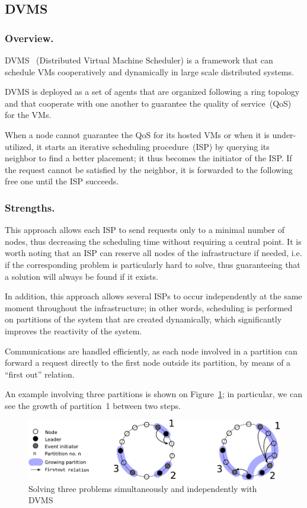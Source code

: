 

\subsection{DVMS}

\subsubsection{Overview.}
DVMS~\cite{quesnel:cpe2012,quesnel:ispa2013}
(Distributed Virtual Machine Scheduler) is a framework that can schedule VMs
cooperatively and dynamically in large scale distributed
systems.

DVMS is deployed as a set of agents that are organized following a ring
topology and that cooperate with one another to guarantee the quality of
service~(QoS) for the VMs.

When a node cannot guarantee the QoS for its hosted VMs or when it is
under-utilized, it starts an iterative scheduling procedure~(ISP) by querying
its neighbor to find a better placement; it thus becomes the initiator of the ISP.
If the request cannot be satisfied by the neighbor, it is forwarded to the
following free one until the ISP succeeds.

\subsubsection{Strengths.}
This approach allows each ISP to send requests only to a minimal
number of nodes, thus decreasing the scheduling time without requiring a
central point.
%
It is worth noting that an ISP can reserve all nodes of the
infrastructure if needed, i.e. if the corresponding problem is particularly hard to solve, thus
guaranteeing that a solution will always be found if it exists.

In addition, this approach allows several ISPs to occur independently at the
same moment throughout the infrastructure; in other words, scheduling is
performed on partitions of the system that are created dynamically, which
significantly improves the reactivity of the system.

Communications are handled efficiently, as each node involved in a partition
can forward a request directly to the first node outside its partition, by
means of a ``first out'' relation.

An example involving three partitions is shown on Figure~\ref{fig:isp}; in
particular, we can see the growth of partition~1 between two steps.
\begin{figure}[h!]
  \centering
  \includegraphics[width=0.9\linewidth]{Figures/resourceAcquisition-standard.pdf}
  \caption{Solving three problems simultaneously and independently with DVMS}%
  \label{fig:isp}%
\end{figure}


